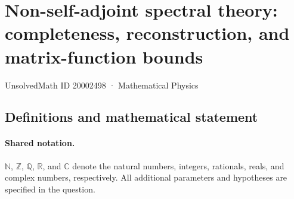 \documentclass[11pt]{article}
\begin{document}
\setcounter{section}{20002497}
\section{Non-self-adjoint spectral theory: completeness, reconstruction, and matrix-function bounds}\label{20002498}
{\small UnsolvedMath ID 20002498 · Mathematical Physics}
\subsection{Definitions and mathematical statement}

\paragraph{Shared notation.}$\mathbb N$, $\mathbb Z$, $\mathbb Q$, $\mathbb R$, and $\mathbb C$ denote the natural numbers, integers, rationals, reals, and complex numbers, respectively. All additional parameters and hypotheses are specified in the question.
\end{document}
